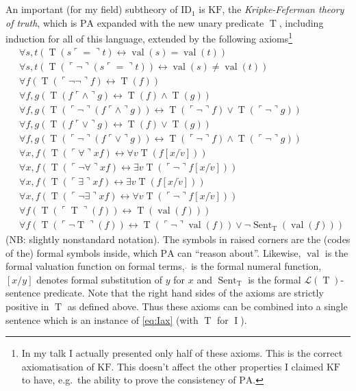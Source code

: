\documentclass{scrartcl}
\theoremstyle{definition}
\theoremstyle{plain}
\theoremstyle{remark}
\DeclareMathOperator{\T}{T}
\newcommand{\liff}{\leftrightarrow}
\renewcommand{\=}{=\!\!\!=}
\newcommand{\num}[1]{\ensuremath{\dot{#1}}}
\newcommand{\GN}[1]{\ensuremath{\ulcorner #1 \urcorner}}
\newcommand{\PA}{\ensuremath{\mathrm{PA}}}
\renewcommand{\L}{\ensuremath{\mathcal{L}}}
\DeclareMathOperator{\val}{val}
\DeclareMathOperator{\Sent}{Sent}
\DeclareMathOperator{\I}{I}
\newcommand{\ID}[2][]{\ensuremath{\widehat{\mathrm{ID}}_{#2}^{#1}}}
\newcommand{\KF}{\ensuremath{\mathrm{KF}}}
\begin{document}
An important (for my field) subtheory of $\ID1$ is $\KF$, the \emph{Kripke-Feferman theory of truth}, which is $\PA$ expanded with the new unary predicate $\T$, including induction for all of this language, extended by the following axioms\footnote{In my talk I actually presented only half of these axioms. This is the correct axiomatisation of $\KF$. This doesn't affect the other properties I claimed $\KF$ to have, e.g.~the ability to prove the consistency of $\PA$.}
\begin{align}
  &\forall s,t (\T(s \GN{=} t) \liff \val(s) = \val(t))\\
  &\forall s,t (\T(\GN{\neg} (s \GN{=} t)) \liff \val(s) \not= \val(t))\\
  &\forall f (\T(\GN{\neg \neg} f) \liff \T(f))\\
  &\forall f,g (\T(f \GN{\land} g) \liff \T(f) \land \T(g))\\
  &\forall f,g (\T(\GN{\neg} (f \GN{\land} g)) \liff \T(\GN{\neg} f) \lor \T(\GN{\neg} g))\\
  &\forall f,g (\T(f \GN{\lor} g) \liff \T(f) \lor \T(g))\\
  &\forall f,g (\T(\GN{\neg} (f \GN{\lor} g)) \liff \T(\GN{\neg} f) \land \T(\GN{\neg} g))\\
  &\forall x,f (\T(\GN{\forall} x f) \liff \forall v \T(f[x/\num{v}]))\\
  &\forall x,f (\T(\GN{\neg \forall} x f) \liff \exists v \T(\GN{\neg} f[x/\num{v}]))\\
  &\forall x,f (\T(\GN{\exists} x f) \liff \exists v \T(f[x/\num{v}]))\\
  &\forall x,f (\T(\GN{\neg \exists} x f) \liff \forall v \T(\GN{\neg} f[x/\num{v}]))\\
  &\forall f (\T(\GN{\T}(f)) \liff \T(\val(f)))\\
  &\forall f (\T(\GN{\neg \T}(f)) \liff \T(\GN{\neg} \val(f)) \lor \neg \Sent_{\T}(\val(f)))
\end{align}
(NB: slightly nonstandard notation). The symbols in raised corners are the (codes of the) formal symbols inside, which $\PA$ can ``reason about''. Likewise, $\val$ is the formal valuation function on formal terms, $\num{}$ is the formal numeral function, $[x/y]$ denotes formal substitution of $y$ for $x$ and $\Sent_{\T}$ is the formal $\L(\T)$-sentence predicate. Note that the right hand sides of the axioms are strictly positive in $\T$ as defined above. Thus these axioms can be combined into a single sentence which is an instance of \eqref{eq:Iax} (with $\T$ for $\I$).
\end{document}
